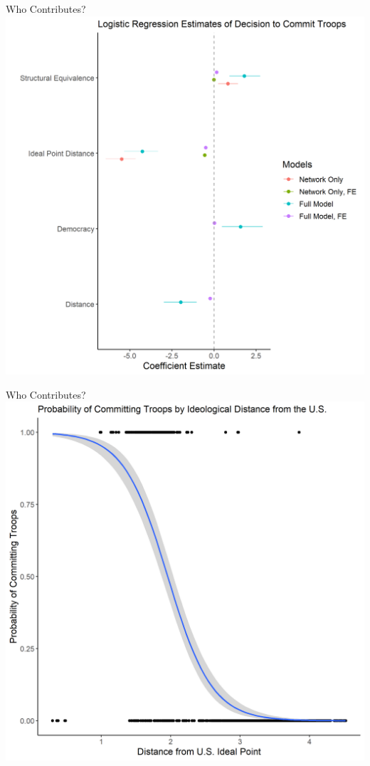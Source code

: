 \documentclass[11pt]{beamer}
\begin{document}
\begin{frame}{Who Contributes?}
  \centering
  \includegraphics[scale=0.45]{../figures/logit_coef.png}
\end{frame}

\begin{frame}{Who Contributes?}
  \centering
  \includegraphics[scale=0.45]{../figures/logit.png}
\end{frame}
\end{document}
